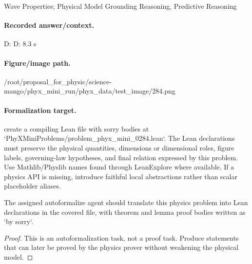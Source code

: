 Wave Properties; Physical Model Grounding Reasoning, Predictive Reasoning

\paragraph{Recorded answer/context.}
D: D: 8.3 s

\paragraph{Figure/image path.}
/root/proposal\_for\_physic/science-mango/phyx\_mini\_run/phyx\_data/test\_image/284.png

\paragraph{Formalization target.}
create a compiling Lean file with sorry bodies at `PhyXMiniProblems/problem\_phyx\_mini\_0284.lean`. The Lean declarations must preserve the physical quantities, dimensions or dimensional roles, figure labels, governing-law hypotheses, and final relation expressed by this problem.
Use Mathlib/Physlib names found through LeanExplore where available. If a physics API is missing, introduce faithful local abstractions rather than scalar placeholder aliases.

\begin{theorem}
\label{thm:physics:phyx_mini_0284:target}
The assigned autoformalize agent should translate this physics problem into Lean declarations in the covered file, with theorem and lemma proof bodies written as `by sorry`.
\end{theorem}
\begin{proof}
This is an autoformalization task, not a proof task. Produce statements that can later be proved by the physics prover without weakening the physical model.
\end{proof}

